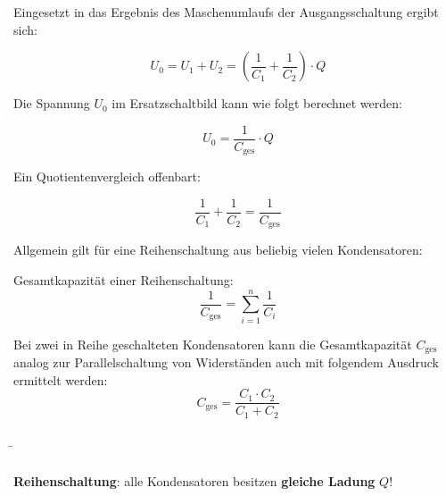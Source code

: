 \begin{frame}
{		Eingesetzt in das Ergebnis des Maschenumlaufs der Ausgangsschaltung ergibt sich:
		
		\begin{equation*}
			U_0 = U_1 + U_2 = \left( \frac{1}{C_1} + \frac{1}{C_2} \right) \cdot Q
		\end{equation*}
		
		Die Spannung $U_0$ im Ersatzschaltbild kann wie folgt berechnet werden:
		
		\begin{equation*}
			U_0 = \frac{1}{C_\mathrm{ges}} \cdot Q
		\end{equation*}
		
		Ein Quotientenvergleich offenbart:
		
		\begin{equation*}
			\frac{1}{C_1} + \frac{1}{C_2} = \frac{1}{C_\mathrm{ges}}
		\end{equation*}
		
		Allgemein gilt für eine Reihenschaltung aus beliebig vielen Kondensatoren:
		
		\begin{Merksatz}{Gesamtkapazität einer Reihenschaltung:}
			\begin{equation}
				\frac{1}{C_\mathrm{ges}} = \sum_{i = 1}^{n} \frac{1}{C_i}
			\end{equation}
		\end{Merksatz}
		
		
		Bei zwei in Reihe geschalteten Kondensatoren kann die Gesamtkapazität $C_\mathrm{ges}$ analog zur 
		Parallelschaltung von Widerständen auch mit folgendem Ausdruck ermittelt werden:\\
		
		\begin{equation*}
			C_\mathrm{ges} = \frac{C_1 \cdot C_2}{C_1 + C_2}
		\end{equation*}

		
	}
	
	
	
	\b{
		\begin{columns}
			
			\vspace{-110pt}
			
			\textbf{Reihenschaltung}: alle Kondensatoren besitzen \textbf{gleiche Ladung} $Q$!\\
			
			\vspace*{5pt}
			

\end{columns}}
\end{frame}
